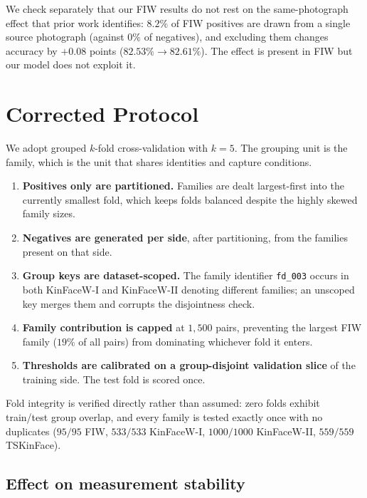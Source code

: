 \documentclass[journal,12pt]{IEEEtran}
\begin{document}
We check separately that our FIW results do not rest on the same-photograph
effect that prior work identifies: $8.2\%$ of FIW positives are drawn from a
single source photograph (against $0\%$ of negatives), and excluding them
changes accuracy by $+0.08$ points ($82.53\% \to 82.61\%$). The effect is
present in FIW but our model does not exploit it.

\section{Corrected Protocol}
\label{sec:protocol}

We adopt grouped $k$-fold cross-validation with $k=5$. The grouping unit is the
family, which is the unit that shares identities and capture conditions.

\begin{enumerate}
\item \textbf{Positives only are partitioned.} Families are dealt largest-first
into the currently smallest fold, which keeps folds balanced despite the highly
skewed family sizes.
\item \textbf{Negatives are generated per side}, after partitioning, from the
families present on that side.
\item \textbf{Group keys are dataset-scoped.} The family identifier
\texttt{fd\_003} occurs in both KinFaceW-I and KinFaceW-II denoting different
families; an unscoped key merges them and corrupts the disjointness check.
\item \textbf{Family contribution is capped} at $1{,}500$ pairs, preventing the
largest FIW family ($19\%$ of all pairs) from dominating whichever fold it
enters.
\item \textbf{Thresholds are calibrated on a group-disjoint validation slice} of
the training side. The test fold is scored once.
\end{enumerate}

Fold integrity is verified directly rather than assumed: zero folds exhibit
train/test group overlap, and every family is tested exactly once with no
duplicates ($95/95$ FIW, $533/533$ KinFaceW-I, $1000/1000$ KinFaceW-II,
$559/559$ TSKinFace).

\subsection{Effect on measurement stability}
\end{document}
